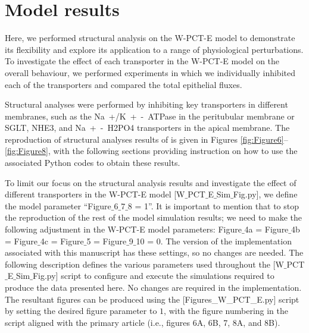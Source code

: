 \documentclass[fleqn,10pt]{physiome}
\begin{document}
\section{Model results}
 Here, we performed structural analysis on the W-PCT-E model to demonstrate its flexibility and explore its application to a range of physiological perturbations.
 To investigate the effect of each transporter in the W-PCT-E model on the overall behaviour, we performed experiments in which we individually inhibited each of the transporters and compared the total epithelial fluxes.
 
 Structural analyses were performed by inhibiting key transporters in different membranes, such as the \si{Na+/K+-ATPase} in the peritubular membrane or \si{SGLT}, \si{NHE3}, and \si{Na+-H2PO4} transporters in the apical membrane. The reproduction of structural analyses results of \citet{noroozbabaee2022modular} is given in Figures \ref{fig:Figure6}--\ref{fig:Figure8}, with the following sections providing instruction on how to use the associated Python codes to obtain these results.
 
To limit our focus on the structural analysis results and investigate the effect of different transporters in the W-PCT-E model [W$\_$PCT$\_$E$\_$Sim$\_$Fig.py], we define the model parameter ``Figure$\_$6$\_$7$\_$8 = 1''. It is important to mention that to stop the reproduction of the rest of the model simulation results; we need to make the following adjustment in the W-PCT-E model parameters: Figure$\_$4a = Figure$\_$4b = Figure$\_$4c = Figure$\_$5 = Figure$\_$9$\_$10 = 0. The version of the implementation associated with this manuscript has these settings, so no changes are needed. The following description defines the various parameters used throughout the [W$\_$PCT$\_$E$\_$Sim$\_$Fig.py] script to configure and execute the simulations required to produce the data presented here. No changes are required in the implementation. The resultant figures can be produced using the [Figures\_W\_PCT\_E.py] script by setting the desired figure parameter to $1$, with the figure numbering in the script aligned with the primary article (i.e., figures 6A, 6B, 7, 8A, and 8B).
\end{document}
